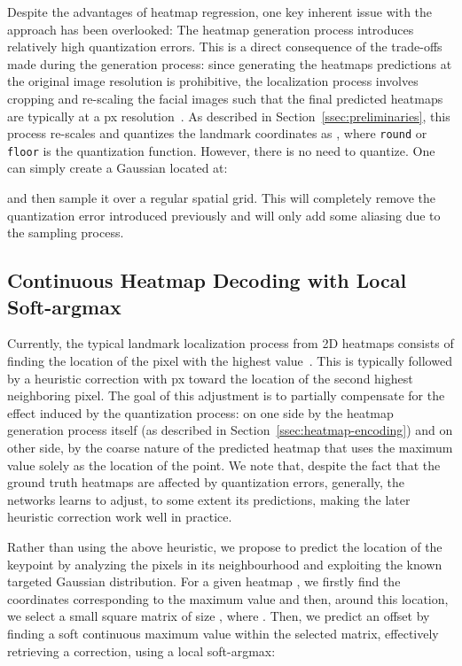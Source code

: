 \documentclass{bmvc2k}
\begin{document}
Despite the advantages of heatmap regression, one key inherent issue with the approach has been overlooked: The heatmap generation process introduces relatively high quantization errors. This is a direct consequence of the trade-offs made during the generation process: since generating the heatmaps predictions at the original image resolution is prohibitive, the localization process involves cropping and re-scaling the facial images such that the final predicted heatmaps are typically at a px resolution~\cite{bulat2017far}. 
As described in Section~\ref{ssec:preliminaries}, this process re-scales and quantizes the landmark coordinates as
, where \texttt{round} or \texttt{floor} is the quantization function. However, there is no need to quantize. One can simply create a Gaussian located at:

and then sample it over a regular spatial grid. This will completely remove the quantization error introduced previously and will only add some aliasing due to the sampling process.

\subsection{Continuous Heatmap Decoding with Local Soft-argmax}\label{ssec:heatmap-decoding}

Currently, the typical landmark localization process from 2D heatmaps consists of finding the location of the pixel with the highest value~\cite{bulat2017far}. This is typically followed by a heuristic correction with px toward the location of the second highest neighboring pixel. The goal of this adjustment is to partially compensate for the effect induced by the quantization process: on one side by the heatmap generation process itself (as described in Section~\ref{ssec:heatmap-encoding}) and on other side, by the coarse nature of the predicted heatmap that uses the maximum value solely as the location of the point. We note that, despite the fact that the ground truth heatmaps are affected by quantization errors, generally, the networks learns to adjust, to some extent its predictions, making the later heuristic correction work well in practice.

Rather than using the above heuristic, we propose to predict the location of the keypoint by analyzing the pixels in its neighbourhood and exploiting the known targeted Gaussian distribution. For a given heatmap , we firstly find the coordinates corresponding to the maximum value  and then, around this location, we select a small square matrix  of size , where . Then, we predict an offset  by finding a soft continuous maximum value within the selected matrix, effectively retrieving a correction, using a local soft-argmax:
\end{document}
